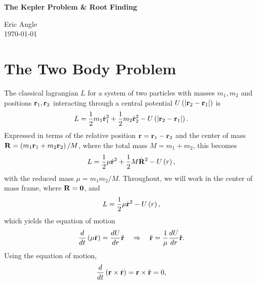 \documentclass[10pt]{article}
\begin{document}
\begin{center}
{\LARGE \bf The Kepler Problem \& Root Finding} \\
\end{center}
\begin{center}
Eric Angle \\
\today
\end{center}

\section{The Two Body Problem}
\noindent The classical lagrangian $L$ for a system of two particles with masses $m_1,m_2$ and positions ${\bf r}_1,{\bf r}_2$ interacting through a central potential $U\left(\left|{\bf r}_2-{\bf r}_1\right|\right)$ is
\begin{equation*}
L = \frac{1}{2}m_1\dot{\bf r}_1^2 + \frac{1}{2}m_2\dot{\bf r}_2^2 - U\left(\left|{\bf r}_2-{\bf r}_1\right|\right).
\end{equation*}
\noindent Expressed in terms of the relative position ${\bf r} = {\bf r}_1 - {\bf r}_2$ and the center of mass ${\bf R} = \left(m_1 {\bf r}_1 + m_2 {\bf r}_2\right)/M$, where the total mass $M = m_1 + m_2$, this becomes
\begin{equation*}
L = \frac{1}{2}\mu \dot{\bf r}^2 + \frac{1}{2}M\dot{\bf R}^2 - U\left(r\right),
\end{equation*}
\noindent with the reduced mass $\mu = m_1 m_2 / M$. Throughout, we will work in the center of mass frame, where $\bf{R} = 0$, and 
\begin{equation*}
L = \frac{1}{2}\mu \dot{\bf r}^2 - U\left(r\right),
\end{equation*}
\noindent which yields the equation of motion
\begin{equation*}
\frac{d}{dt}\left(\mu \dot{\bf r}\right) = \frac{dU}{dr} \hat{\bf r} \ \ \ \Rightarrow \ \ \ \ddot{\bf r} = \frac{1}{\mu} \frac{dU}{dr} \hat{\bf r}.
\end{equation*}
\noindent Using the equation of motion,
\begin{equation*}
\frac{d}{dt} \left({\bf r} \times \dot{\bf r}\right) = {\bf r} \times \ddot{\bf r} = 0,
\end{equation*}
\end{document}

